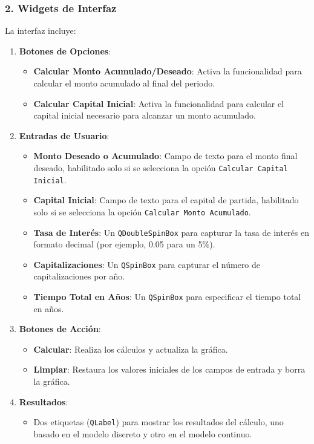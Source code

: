 \documentclass{article}
\begin{document}
\subsubsection{2. Widgets de Interfaz}
La interfaz incluye:
\begin{enumerate}
    \item \textbf{Botones de Opciones}:
    \begin{itemize}
        \item \textbf{Calcular Monto Acumulado/Deseado}: Activa la funcionalidad para calcular el monto acumulado al final del periodo.
        \item \textbf{Calcular Capital Inicial}: Activa la funcionalidad para calcular el capital inicial necesario para alcanzar un monto acumulado.
    \end{itemize}

    \item \textbf{Entradas de Usuario}:
    \begin{itemize}
        \item \textbf{Monto Deseado o Acumulado}: Campo de texto para el monto final deseado, habilitado solo si se selecciona la opción \texttt{Calcular Capital Inicial}.
        \item \textbf{Capital Inicial}: Campo de texto para el capital de partida, habilitado solo si se selecciona la opción \texttt{Calcular Monto Acumulado}.
        \item \textbf{Tasa de Interés}: Un \texttt{QDoubleSpinBox} para capturar la tasa de interés en formato decimal (por ejemplo, 0.05 para un 5\%).
        \item \textbf{Capitalizaciones}: Un \texttt{QSpinBox} para capturar el número de capitalizaciones por año.
        \item \textbf{Tiempo Total en Años}: Un \texttt{QSpinBox} para especificar el tiempo total en años.
    \end{itemize}

    \item \textbf{Botones de Acción}:
    \begin{itemize}
        \item \textbf{Calcular}: Realiza los cálculos y actualiza la gráfica.
        \item \textbf{Limpiar}: Restaura los valores iniciales de los campos de entrada y borra la gráfica.
    \end{itemize}

    \item \textbf{Resultados}:
    \begin{itemize}
        \item Dos etiquetas (\texttt{QLabel}) para mostrar los resultados del cálculo, uno basado en el modelo discreto y otro en el modelo continuo.
    \end{itemize}


\end{enumerate}
\end{document}

